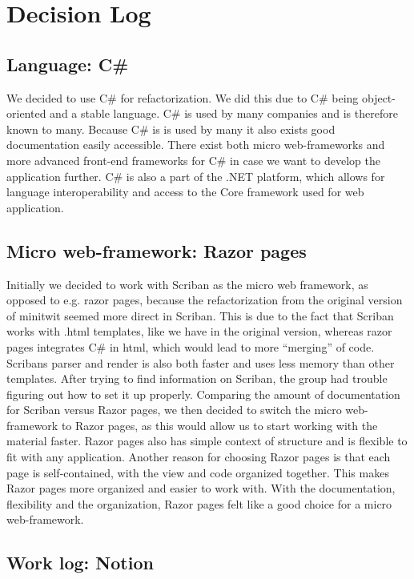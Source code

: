 \section{Decision Log}
\subsection{Language: C\#}

We decided to use C# for refactorization. We did this due to C# being object-oriented and a stable language. C# is used by many companies and is therefore known to many. Because C# is is used by many it also exists good documentation easily accessible.
There exist both micro web-frameworks and more advanced front-end frameworks for C# in case we want to develop the application further.
C# is also a part of the .NET platform, which allows for language interoperability and access to the Core framework used for web application.

\subsection{Micro web-framework: Razor pages}

Initially we decided to work with Scriban as the micro web framework, as opposed to e.g. razor pages, because the refactorization from the original version of minitwit seemed more direct in Scriban. This is due to the fact that Scriban works with .html templates, like we have in the original version, whereas razor pages integrates C# in html, which would lead to more “merging” of code.
Scribans parser and render is also both faster and uses less memory than other templates.
After trying to find information on Scriban, the group had trouble figuring out how to set it up properly. Comparing the amount of documentation for Scriban versus Razor pages, we then decided to switch the micro web-framework to Razor pages, as this would allow us to start working with the material faster.
Razor pages also has simple context of structure and is flexible to fit with any application. Another reason for choosing Razor pages is that each page is self-contained, with the view and code organized together.  This makes Razor pages more organized and easier to work with. With the documentation, flexibility and the organization, Razor pages felt like a good choice for a micro web-framework.

\subsection{Work log: Notion}

